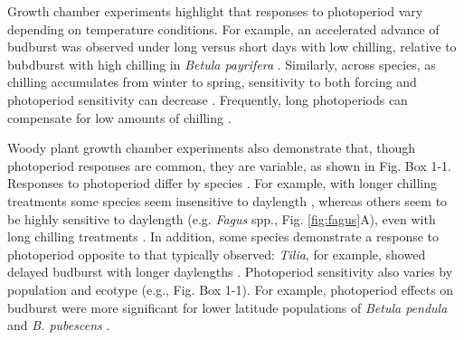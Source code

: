 \documentclass{article}
\begin{document}
\par Growth chamber experiments highlight that responses to photoperiod vary depending on temperature conditions. For example, an accelerated advance of budburst was observed under long versus short days with low chilling, relative to bubdburst with high chilling in \emph{Betula payrifera} \citep[][see Fig. Box 1-1]{Hawkins:2012}. Similarly, across species, as chilling accumulates from winter to spring, sensitivity to both forcing and photoperiod sensitivity can decrease \citep{malyshev2018}. Frequently, long photoperiods can compensate for low amounts of chilling \citep{Caffarra:2011b,Myking:1995,Heide:1993}.%
\par Woody plant growth chamber experiments also demonstrate that, though photoperiod responses are common, they are variable, as shown in Fig. Box 1-1. Responses to photoperiod differ by species \citep[e.g.,][]{flynn2018,zohner2016,Basler:2014aa,Basler:2012,Howe:1996,Heide:1993a}.
For example, with longer chilling treatments some species seem insensitive to daylength \citep[e.g., \emph{Hammamelis} spp., \emph{Prunus} spp.,][]{zohner2016}, whereas others seem to be highly sensitive to daylength (e.g. \emph{Fagus} spp., Fig. \ref{fig:fagus}A), even with long chilling treatments \citep{zohner2016}. In addition, some species demonstrate a response to photoperiod opposite to that typically observed: \emph{Tilia}, for example, showed delayed budburst with longer daylengths \citep[see Fig. Box 1-1,][]{Ashby:1962aa}.
Photoperiod sensitivity also varies by population and ecotype (e.g., Fig. Box 1-1). For example, photoperiod effects on budburst were more significant for lower latitude populations of \emph{Betula pendula} and \emph{B. pubescens} \citep{Partanen:2005aa}. 
\end{document}
